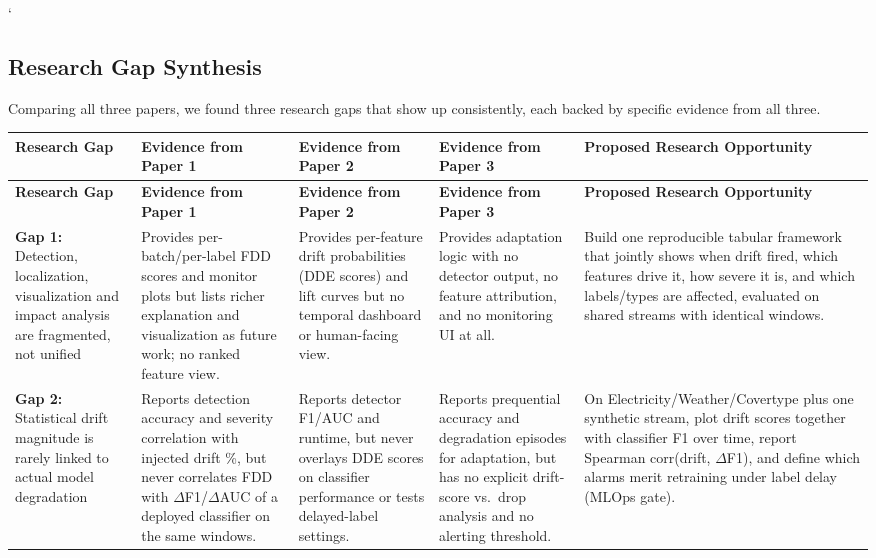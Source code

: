 `\documentclass[10pt]{article}
\begin{document}
\clearpage
{}
\begin{landscape}
\section{Research Gap Synthesis}

Comparing all three papers, we found three research gaps that show up consistently, each backed by specific evidence from all three.

\begin{longtable}{
	L{3.2cm} L{4.2cm} L{4.2cm} L{4.2cm} L{4.6cm}
}
\toprule
{}
\textbf{Research Gap} & \textbf{Evidence from Paper 1} & \textbf{Evidence from Paper 2} & \textbf{Evidence from Paper 3} & \textbf{Proposed Research Opportunity} \\
\midrule
\endfirsthead
{}
\textbf{Research Gap} & \textbf{Evidence from Paper 1} & \textbf{Evidence from Paper 2} & \textbf{Evidence from Paper 3} & \textbf{Proposed Research Opportunity} \\
\midrule
\endhead
\midrule
\endfoot
\bottomrule
\endlastfoot

\textbf{Gap 1:} Detection, localization, visualization and impact analysis are fragmented, not unified &
Provides per-batch/per-label FDD scores and monitor plots but lists richer explanation and visualization as future work; no ranked feature view. &
Provides per-feature drift probabilities (DDE scores) and lift curves but no temporal dashboard or human-facing view. &
Provides adaptation logic with no detector output, no feature attribution, and no monitoring UI at all. &
Build one reproducible tabular framework that jointly shows when drift fired, which features drive it, how severe it is, and which labels/types are affected, evaluated on shared streams with identical windows. \\[6pt]

\textbf{Gap 2:} Statistical drift magnitude is rarely linked to actual model degradation &
Reports detection accuracy and severity correlation with injected drift \%, but never correlates FDD with $\Delta$F1/$\Delta$AUC of a deployed classifier on the same windows. &
Reports detector F1/AUC and runtime, but never overlays DDE scores on classifier performance or tests delayed-label settings. &
Reports prequential accuracy and degradation episodes for adaptation, but has no explicit drift-score vs.\ drop analysis and no alerting threshold. &
On Electricity/Weather/Covertype plus one synthetic stream, plot drift scores together with classifier F1 over time, report Spearman corr(drift, $\Delta$F1), and define which alarms merit retraining under label delay (MLOps gate). \\[6pt]


\end{longtable}
\end{landscape}
\end{document}
